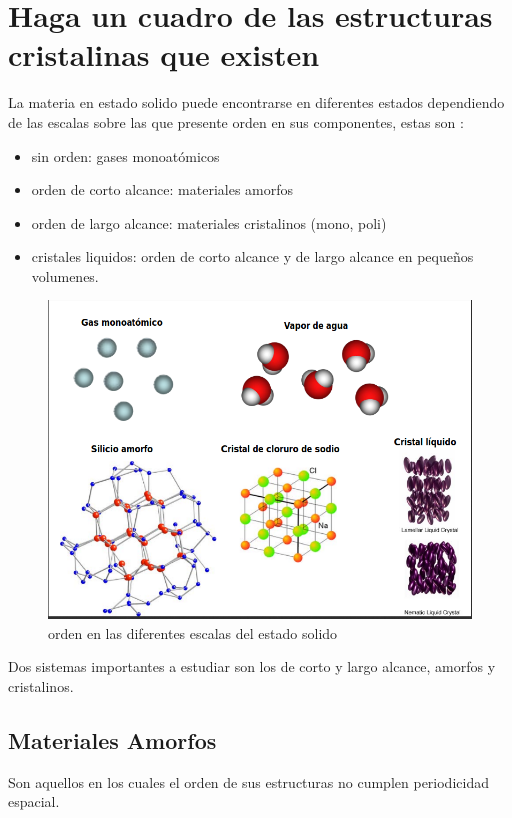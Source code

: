 \documentclass[12pt,a4paper]{article}
\begin{document}
\section{Haga un cuadro de las estructuras cristalinas que existen}

La materia en estado solido puede encontrarse en diferentes estados dependiendo de las escalas sobre las que presente orden en sus componentes, estas son : 

\begin{itemize}
    \item sin orden:  gases monoatómicos 
    \item orden de corto alcance:  materiales amorfos  
    \item orden de largo alcance:  materiales cristalinos (mono, poli)
    \item cristales liquidos: orden de corto alcance y de largo alcance en pequeños volumenes.
\end{itemize}

 \begin{figure}[H]
     \centering
     \includegraphics[scale=0.35]{Q3.png}
     \caption{ orden en las diferentes escalas del estado solido}
     \label{fig:my_label}
 \end{figure}


Dos sistemas importantes a estudiar son los de corto y largo alcance, amorfos y cristalinos.

\subsection{Materiales Amorfos} 
Son aquellos en los cuales el orden de sus estructuras no cumplen periodicidad espacial.
\end{document}
